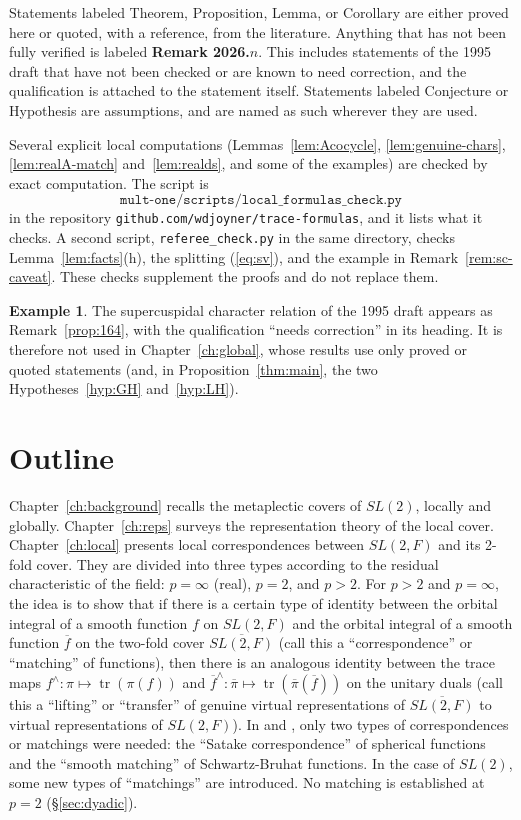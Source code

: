 \documentclass[12pt,letterpaper,openany]{book}
\theoremstyle{plain}
\theoremstyle{definition}
\newtheorem{example}[theorem]{Example}
\theoremstyle{remark}
\theoremstyle{remark}
\newcommand{\tr}{\operatorname{tr}}
\begin{document}
Statements labeled Theorem, Proposition, Lemma, or Corollary are either
proved here or quoted, with a reference, from the literature. Anything that
has not been fully verified is labeled \textbf{Remark 2026.$n$}. This
includes statements of the 1995 draft that have not been checked or are
known to need correction, and the qualification is attached to the
statement itself. Statements labeled Conjecture or Hypothesis are
assumptions, and are named as such wherever they are used.

Several explicit local computations (Lemmas~\ref{lem:Acocycle},
\ref{lem:genuine-chars}, \ref{lem:realA-match} and~\ref{lem:realds}, and
some of the examples) are checked by exact computation. The script is
\[
\texttt{mult-one/scripts/local\_formulas\_check.py}
\]
in the repository \texttt{github.com/wdjoyner/trace-formulas}, and it
lists what it checks. A second script, \texttt{referee\_check.py} in the same directory, checks Lemma~\ref{lem:facts}(h), the splitting
(\ref{eq:sv}), and the example in Remark~\ref{rem:sc-caveat}. These checks supplement the proofs and do not replace them.

\begin{example}
The supercuspidal character relation of the 1995 draft appears as
Remark~\ref{prop:164}, with the qualification ``needs correction'' in its
heading. It is therefore not used in Chapter~\ref{ch:global}, whose results use
only proved or quoted statements (and, in Proposition~\ref{thm:main}, the
two Hypotheses~\ref{hyp:GH} and~\ref{hyp:LH}).
\end{example}

\section{Outline}

Chapter~\ref{ch:background} recalls the metaplectic covers of $SL(2)$,
locally and globally. Chapter~\ref{ch:reps} surveys the representation
theory of the local cover.
Chapter~\ref{ch:local} presents local correspondences between $SL(2,F)$
and its 2-fold cover. They are divided into three types according to the
residual characteristic of the field: $p=\infty$ (real), $p=2$,
and $p>2$. For $p>2$ and $p=\infty$, the idea is to show that if there
is a certain type of identity between the orbital integral of a smooth
function $f$ on $SL(2,F)$ and the orbital integral of a smooth function
$\overline{f}$ on the two-fold cover $\overline{SL(2,F)}$ (call this a
``correspondence'' or ``matching'' of functions), then there is an
analogous identity between the trace maps
$f^\wedge:\pi\longmapsto \tr(\pi(f))$
and $\overline{f}^\wedge:\overline{\pi}\longmapsto
\tr(\overline{\pi}(\overline{f}))$
on the unitary duals (call this a ``lifting'' or ``transfer''
of genuine virtual representations of $\overline{SL(2,F)}$ to
virtual representations of $SL(2,F)$).
In \cite{L4} and \cite{Fl}, only two types
of correspondences or matchings were needed: the
``Satake correspondence'' of spherical functions and the
``smooth matching'' of Schwartz-Bruhat functions.
In the case of $SL(2)$, some new
types of ``matchings'' are introduced. No matching is established at
$p=2$ (\S\ref{sec:dyadic}).
\end{document}
